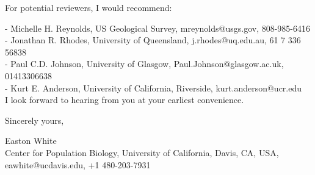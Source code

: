 \documentclass[]{article}
\begin{document}
\noindent For potential reviewers, I would recommend:

\noindent 	- Michelle H. Reynolds, US Geological Survey, mreynolds@usgs.gov, 808-985-6416 \\
	- Jonathan R. Rhodes, University of Queensland, j.rhodes@uq.edu.au, 61 7 336 56838 \\
	- Paul C.D. Johnson, University of Glasgow, Paul.Johnson@glasgow.ac.uk, 01413306638 \\
	- Kurt E. Anderson, University of California, Riverside, kurt.anderson@ucr.edu \\


\medskip
\noindent I look forward to hearing from you at your earliest convenience.
\medskip
\medskip

Sincerely yours,

\medskip
\medskip
\medskip
\medskip

Easton White \\ 
Center for Population Biology, University of California, Davis, CA, USA, eawhite@ucdavis.edu, +1 480-203-7931
\end{document}
